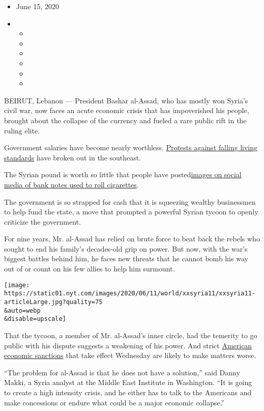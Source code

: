 \begin{itemize}
\item
  June 15, 2020
\item
  \begin{itemize}
  \item
  \item
  \item
  \item
  \item
  \item
  \end{itemize}
\end{itemize}

BEIRUT, Lebanon --- President Bashar al-Assad, who has mostly won
Syria's civil war, now faces an acute economic crisis that has
impoverished his people, brought about the collapse of the currency and
fueled a rare public rift in the ruling elite.

Government salaries have become nearly worthless.
\href{https://www.facebook.com/watch/?v=962481407516349}{Protests
against falling living standards} have broken out in the southeast.

The Syrian pound is worth so little that people have
posted\href{https://twitter.com/Ferhad49838610/status/1269950887218360320}{images
on social media of bank notes used to roll cigarettes}.

The government is so strapped for cash that it is squeezing wealthy
businessmen to help fund the state, a move that prompted a powerful
Syrian tycoon to openly criticize the government.

For nine years, Mr. al-Assad has relied on brute force to beat back the
rebels who sought to end his family's decades-old grip on power. But
now, with the war's biggest battles behind him, he faces new threats
that he cannot bomb his way out of or count on his few allies to help
him surmount.

\texttt{[image: https://static01.nyt.com/images/2020/06/11/world/xxsyria11/xxsyria11-articleLarge.jpg?quality=75\\\&auto=webp\\\&disable=upscale]}

That the tycoon, a member of Mr. al-Assad's inner circle, had the
temerity to go public with his dispute suggests a weakening of his
power. And strict
\href{https://www.nytimes.com/2019/12/16/us/politics/us-syria-sanctions-war-crimes.html}{American
economic sanctions} that take effect Wednesday are likely to make
matters worse.

``The problem for al-Assad is that he does not have a solution,'' said
Danny Makki, a Syria analyst at the Middle East Institute in Washington.
``It is going to create a high intensity crisis, and he either has to
talk to the Americans and make concessions or endure what could be a
major economic collapse.''

